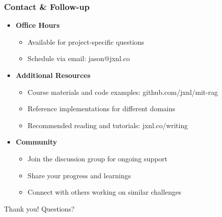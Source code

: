 {    \begin{frame}
        \frametitle{Contact \& Follow-up}
        \begin{itemize}
            \item \textbf{Office Hours}
            \begin{itemize}
                \item Available for project-specific questions
                \item Schedule via email: jason@jxnl.co
            \end{itemize}
            \item \textbf{Additional Resources}
            \begin{itemize}
                \item Course materials and code examples: github.com/jxnl/mit-rag
                \item Reference implementations for different domains
                \item Recommended reading and tutorials: jxnl.co/writing
            \end{itemize}
            \item \textbf{Community}
            \begin{itemize}
                \item Join the discussion group for ongoing support
                \item Share your progress and learnings
                \item Connect with others working on similar challenges
            \end{itemize}
        \end{itemize}
        \vspace{0.5cm}
        \centering
        Thank you! Questions?
    \end{frame}
} %